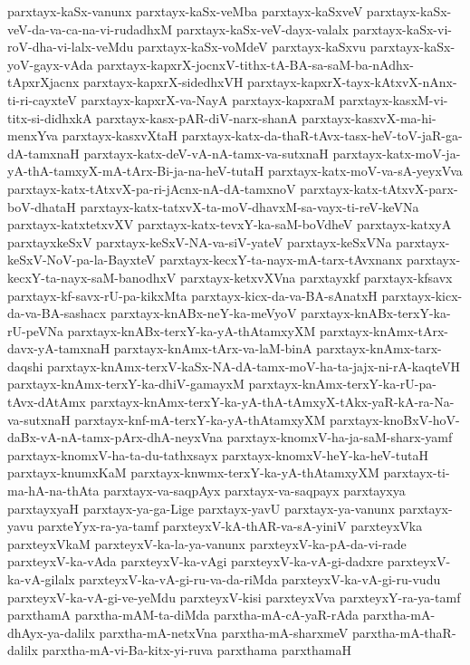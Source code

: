 {parxtayx-kaSx-vanunx
parxtayx-kaSx-veMba
parxtayx-kaSxveV
parxtayx-kaSx-veV-da-va-ca-na-vi-rudadhxM
parxtayx-kaSx-veV-dayx-valalx
parxtayx-kaSx-vi-roV-dha-vi-lalx-veMdu
parxtayx-kaSx-voMdeV
parxtayx-kaSxvu
parxtayx-kaSx-yoV-gayx-vAda
parxtayx-kapxrX-jocnxV-tithx-tA-BA-sa-saM-ba-nAdhx-tApxrXjacnx
parxtayx-kapxrX-sidedhxVH
parxtayx-kapxrX-tayx-kAtxvX-nAnx-ti-ri-cayxteV
parxtayx-kapxrX-va-NayA
parxtayx-kapxraM
parxtayx-kasxM-vi-titx-si-didhxkA
parxtayx-kasx-pAR-diV-narx-shanA
parxtayx-kasxvX-ma-hi-menxYva
parxtayx-kasxvXtaH
parxtayx-katx-da-thaR-tAvx-tasx-heV-toV-jaR-ga-dA-tamxnaH
parxtayx-katx-deV-vA-nA-tamx-va-sutxnaH
parxtayx-katx-moV-ja-yA-thA-tamxyX-mA-tArx-Bi-ja-na-heV-tutaH
parxtayx-katx-moV-va-sA-yeyxVva
parxtayx-katx-tAtxvX-pa-ri-jAcnx-nA-dA-tamxnoV
parxtayx-katx-tAtxvX-parx-boV-dhataH
parxtayx-katx-tatxvX-ta-moV-dhavxM-sa-vayx-ti-reV-keVNa
parxtayx-katxtetxvXV
parxtayx-katx-tevxY-ka-saM-boVdheV
parxtayx-katxyA
parxtayxkeSxV
parxtayx-keSxV-NA-va-siV-yateV
parxtayx-keSxVNa
parxtayx-keSxV-NoV-pa-la-BayxteV
parxtayx-kecxY-ta-nayx-mA-tarx-tAvxnanx
parxtayx-kecxY-ta-nayx-saM-banodhxV
parxtayx-ketxvXVna
parxtayxkf
parxtayx-kfsavx
parxtayx-kf-savx-rU-pa-kikxMta
parxtayx-kicx-da-va-BA-sAnatxH
parxtayx-kicx-da-va-BA-sashacx
parxtayx-knABx-neY-ka-meVyoV
parxtayx-knABx-terxY-ka-rU-peVNa
parxtayx-knABx-terxY-ka-yA-thAtamxyXM
parxtayx-knAmx-tArx-davx-yA-tamxnaH
parxtayx-knAmx-tArx-va-laM-binA
parxtayx-knAmx-tarx-daqshi
parxtayx-knAmx-terxV-kaSx-NA-dA-tamx-moV-ha-ta-jajx-ni-rA-kaqteVH
parxtayx-knAmx-terxY-ka-dhiV-gamayxM
parxtayx-knAmx-terxY-ka-rU-pa-tAvx-dAtAmx
parxtayx-knAmx-terxY-ka-yA-thA-tAmxyX-tAkx-yaR-kA-ra-Na-va-sutxnaH
parxtayx-knf-mA-terxY-ka-yA-thAtamxyXM
parxtayx-knoBxV-hoV-daBx-vA-nA-tamx-pArx-dhA-neyxVna
parxtayx-knomxV-ha-ja-saM-sharx-yamf
parxtayx-knomxV-ha-ta-du-tathxsayx
parxtayx-knomxV-heY-ka-heV-tutaH
parxtayx-knumxKaM
parxtayx-knwmx-terxY-ka-yA-thAtamxyXM
parxtayx-ti-ma-hA-na-thAta
parxtayx-va-saqpAyx
parxtayx-va-saqpayx
parxtayxya
parxtayxyaH
parxtayx-ya-ga-Lige
parxtayx-yavU
parxtayx-ya-vanunx
parxtayx-yavu
parxteYyx-ra-ya-tamf
parxteyxV-kA-thAR-va-sA-yiniV
parxteyxVka
parxteyxVkaM
parxteyxV-ka-la-ya-vanunx
parxteyxV-ka-pA-da-vi-rade
parxteyxV-ka-vAda
parxteyxV-ka-vAgi
parxteyxV-ka-vA-gi-dadxre
parxteyxV-ka-vA-gilalx
parxteyxV-ka-vA-gi-ru-va-da-riMda
parxteyxV-ka-vA-gi-ru-vudu
parxteyxV-ka-vA-gi-ve-yeMdu
parxteyxV-kisi
parxteyxVva
parxteyxY-ra-ya-tamf
parxthamA
parxtha-mAM-ta-diMda
parxtha-mA-cA-yaR-rAda
parxtha-mA-dhAyx-ya-dalilx
parxtha-mA-netxVna
parxtha-mA-sharxmeV
parxtha-mA-thaR-dalilx
parxtha-mA-vi-Ba-kitx-yi-ruva
parxthama
parxthamaH
}
